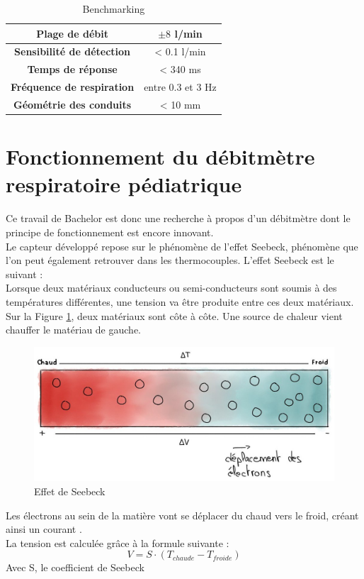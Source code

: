 \begin{table}[H]
    \centering
    \begin{tabular}{|c|c|}
        \hline
        \textbf{Plage de débit}           & $\pm 8$ l/min     \\
        \hline
        \textbf{Sensibilité de détection} & < 0.1 l/min       \\
        \hline
        \textbf{Temps de réponse}         & < 340 ms          \\
        \hline
        \textbf{Fréquence de respiration} & entre 0.3 et 3 Hz \\
        \hline
        \textbf{Géométrie des conduits}   & < 10 mm           \\
        \hline
    \end{tabular}
    \caption{Benchmarking}
    \label{fig:benchmarking}
\end{table}


\section{Fonctionnement du débitmètre respiratoire pédiatrique}
Ce travail de Bachelor est donc une recherche à propos d'un débitmètre dont le principe de fonctionnement est encore innovant. \\

Le capteur développé repose sur le phénomène de l'effet Seebeck, phénomène que l'on peut également retrouver dans les thermocouples. L'effet 
Seebeck est le suivant :\\
Lorsque deux matériaux conducteurs ou semi-conducteurs sont soumis à des températures différentes, une tension va être produite entre ces deux matériaux. \\
Sur la Figure \ref{fig:Seebeck}, deux matériaux sont côte à côte. Une source de chaleur vient chauffer le matériau de gauche. 
\begin{figure}[H]
    \centering
    \includegraphics[scale = 0.3]{images/Seebeck.jpg}
    \caption{Effet de Seebeck}
    \label{fig:Seebeck}
\end{figure}
Les électrons au sein de la matière vont se déplacer du chaud vers le froid, créant ainsi un courant \cite{instrumentys_effet_2021}.\\
La tension est calculée grâce à la formule suivante :
\[V = S \cdot (T_{chaude} - T_{froide})\]
Avec S, le coefficient de Seebeck\\

